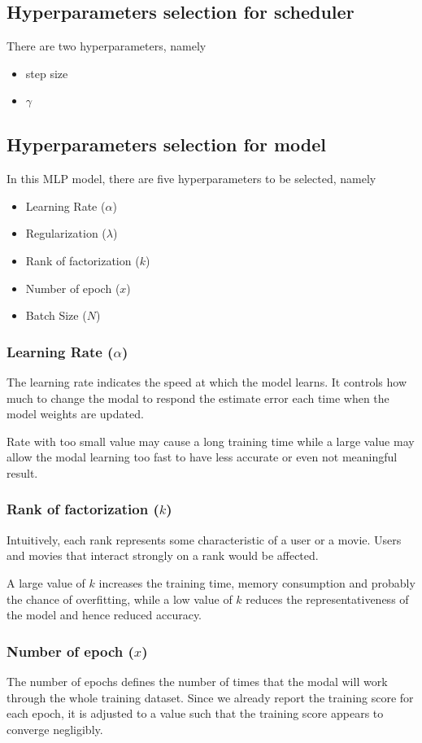 \documentclass[final]{cvpr}
\begin{document}
\subsection{Hyperparameters selection for scheduler}
There are two hyperparameters, namely
\begin{itemize}
    \item step size
    \item $\gamma$
\end{itemize}

\subsection{Hyperparameters selection for model}
In this MLP model, there are five hyperparameters to be selected, namely
\begin{itemize}
	\item Learning Rate ($\alpha$)
	\item Regularization ($\lambda$)
	\item Rank of factorization ($k$)
	\item Number of epoch ($x$)
	\item Batch Size ($N$)
\end{itemize}


\subsubsection{Learning Rate ($\alpha$)}
The learning rate indicates the speed at which the model learns. It controls how much to change the modal to respond the estimate error each time when the model weights are updated.

Rate with too small value may cause a long training time while a large value may allow the modal learning too fast to have less accurate or even not meaningful result.

\subsubsection{Rank of factorization ($k$)}
Intuitively, each rank represents some characteristic of a user or a movie. Users and movies that interact strongly on a rank would be affected.

A large value of $k$ increases the training time, memory consumption and probably the chance of overfitting,
while a low value of $k$ reduces the representativeness of the model and hence reduced accuracy.

\subsubsection{Number of epoch ($x$)}
The number of epochs defines the number of times that the modal will work through the whole training dataset.
Since we already report the training score for each epoch, it is adjusted to a value such that the training score appears to converge negligibly.
\end{document}
